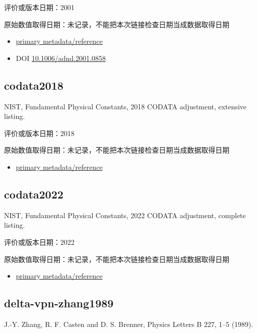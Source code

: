 \documentclass[
  11pt,
  letterpaper,
]{article}
\providecommand{\tightlist}{%
  \setlength{\itemsep}{0pt}\setlength{\parskip}{0pt}}
\begin{document}
评价或版本日期：2001

原始数值取得日期：未记录，不能把本次链接检查日期当成数据取得日期

\begin{itemize}
\tightlist
\item
  \href{https://www.nndc.bnl.gov/be2/}{primary metadata/reference}
\item
  DOI
  \href{https://doi.org/10.1006/adnd.2001.0858}{10.1006/adnd.2001.0858}
\end{itemize}

\subsection{codata2018}\label{codata2018}

NIST, Fundamental Physical Constants, 2018 CODATA adjustment, extensive
listing.

评价或版本日期：2018

原始数值取得日期：未记录，不能把本次链接检查日期当成数据取得日期

\begin{itemize}
\tightlist
\item
  \href{https://physics.nist.gov/cuu/pdf/all_2018.pdf}{primary
  metadata/reference}
\end{itemize}

\subsection{codata2022}\label{codata2022}

NIST, Fundamental Physical Constants, 2022 CODATA adjustment, complete
listing.

评价或版本日期：2022

原始数值取得日期：未记录，不能把本次链接检查日期当成数据取得日期

\begin{itemize}
\tightlist
\item
  \href{https://physics.nist.gov/cuu/Constants/Table/allascii.txt}{primary
  metadata/reference}
\end{itemize}

\subsection{delta-vpn-zhang1989}\label{delta-vpn-zhang1989}

J.-Y. Zhang, R. F. Casten and D. S. Brenner, Physics Letters B 227, 1--5
(1989).
\end{document}
